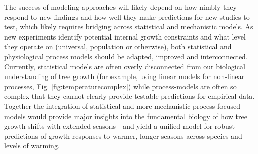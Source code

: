 The success of modeling approaches will likely depend on how nimbly they respond to new findings and how well they make predictions for new studies to test, which likely requires bridging across statistical and mechanistic models. As new experiments identify potential internal growth constraints and what level they operate on (universal, population or otherwise), both statistical and physiological process models should be adapted, improved and interconnected. Currently, statistical models are often overly disconnected from our biological understanding of tree growth (for example, using linear models for non-linear processes, Fig. \ref{fig:temperaturecomplex}) while process-models are often so complex that they cannot clearly provide testable predictions for empirical data. Together the integration of statistical and more mechanistic process-focused models would provide major insights into the fundamental biology of how tree growth shifts with extended seasons---and yield a unified model for robust predictions of growth responses to warmer, longer seasons across species and levels of warming. %